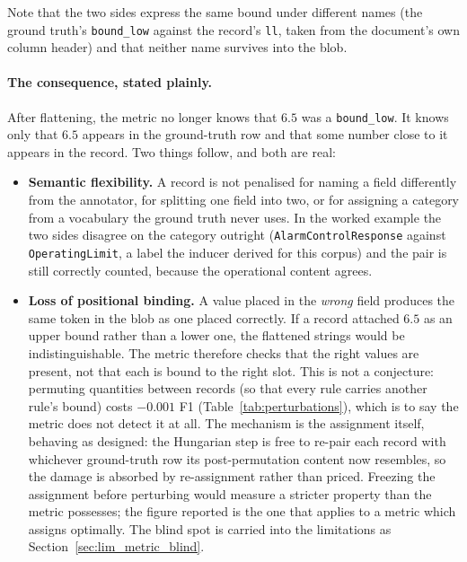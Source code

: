 \documentclass[11pt]{article}
\begin{document}
Note that the two sides express the same bound under different names (the
ground truth's \texttt{bound\_low} against the record's \texttt{ll}, taken from
the document's own column header) and that neither name survives into the
blob.

\paragraph{The consequence, stated plainly.} After flattening, the metric no
longer knows that $6.5$ was a \texttt{bound\_low}. It knows only that $6.5$
appears in the ground-truth row and that some number close to it appears in the
record. Two things follow, and both are real:

\begin{itemize}
    \item \textbf{Semantic flexibility.} A record is not penalised for naming a field
          differently from the annotator, for splitting one field into two, or
          for assigning a category from a vocabulary the ground truth never
          uses. In the worked example the two sides disagree on the category
          outright (\texttt{AlarmControlResponse} against
          \texttt{OperatingLimit}, a label the inducer derived
          for this corpus) and the pair is still correctly counted, because
          the operational content agrees.
    \item \textbf{Loss of positional binding.} A value placed in the \emph{wrong} field produces
          the same token in the blob as one placed correctly. If a record
          attached $6.5$ as an upper bound rather than a lower one, the flattened
          strings would be indistinguishable. The metric therefore checks that
          the right values are present, not that each is bound to the right slot.
          This is not a conjecture: permuting quantities between records (so
          that every rule carries another rule's bound) costs $-0.001$ F1
          (Table~\ref{tab:perturbations}), which is to say the metric does not
          detect it at all. The mechanism is the assignment itself, behaving as
          designed: the Hungarian step is free to re-pair each record with
          whichever ground-truth row its post-permutation content now resembles,
          so the damage is absorbed by re-assignment rather than priced.
          Freezing the assignment before perturbing would measure a stricter
          property than the metric possesses; the figure reported is the one
          that applies to a metric which assigns optimally. The blind spot is carried
          into the limitations as Section~\ref{sec:lim_metric_blind}.
\end{itemize}
\end{document}
